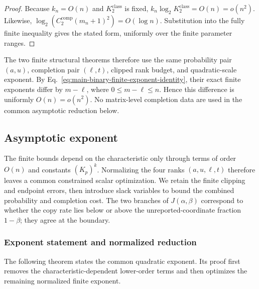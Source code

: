 \documentclass[11pt]{article}
\newcommand{\1}{\mathbf 1}
\theoremstyle{plain}
\theoremstyle{definition}
\theoremstyle{remark}
\begin{document}
\begin{proof}
Because $k_n=O(n)$ and $K_2^{\mathrm{class}}$ is fixed,
$k_n\log_2K_2^{\mathrm{class}}=O(n)=o(n^2)$.  Likewise,
$\log_2(C_2^{\mathrm{comp}}(m_n+1)^2)=O(\log n)$.  Substitution into the
fully finite inequality gives the stated form, uniformly over the finite
parameter ranges.
\end{proof}

The two finite structural theorems therefore use the same probability pair
$(a,u)$, completion pair $(\ell,t)$, clipped rank budget, and quadratic-scale
exponent.  By Eq.~\eqref{eq:main-binary-finite-exponent-identity}, their exact
finite exponents differ by $m-\ell$, where $0\le m-\ell\le n$.  Hence this difference is uniformly
$O(n)=o(n^2)$.  No matrix-level completion data are used in the common
asymptotic reduction below.

\subsection{Asymptotic exponent}
\label{subsec:common-exponent-functions}
The finite bounds depend on the characteristic only through terms of order
$O(n)$ and constants $(K_p)^k$.  Normalizing the four ranks
$(a,u,\ell,t)$ therefore leaves a common constrained scalar optimization.
We retain the finite clipping and endpoint errors, then introduce slack
variables to bound the combined probability and completion cost.  The two
branches of $J(\alpha,\beta)$ correspond to whether the copy rate lies below
or above the unreported-coordinate fraction $1-\beta$; they agree at the
boundary.

\subsubsection{Exponent statement and normalized reduction}
\label{subsubsec:all-prime-exponent-reduction}

The following theorem states the common quadratic exponent. Its proof first removes the characteristic-dependent lower-order terms and then optimizes the remaining normalized finite exponent.
\end{document}
